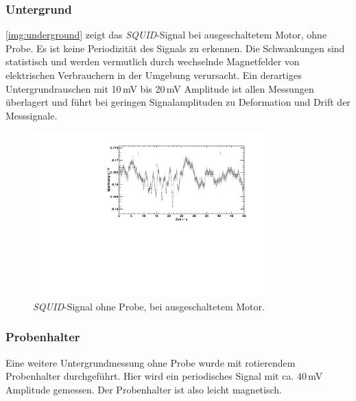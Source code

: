 \subsubsection{Untergrund}
\autoref{img:underground} zeigt das \emph{SQUID}-Signal bei ausgeschaltetem Motor, ohne Probe.
Es ist keine Periodizität des Signals zu erkennen. Die Schwankungen sind statistisch
und werden vermutlich durch wechselnde Magnetfelder von elektrischen Verbrauchern in der Umgebung verursacht.
Ein derartiges Untergrundrauschen mit 10\,mV bis 20\,mV Amplitude
ist allen Messungen überlagert und führt bei geringen Signalamplituden zu
Deformation und Drift der Messsignale.

\begin{figure}[H]
\begin{center}
  \includegraphics[width=0.8\textwidth]{../img/Untergrund.pdf}
  \caption{\emph{SQUID}-Signal ohne Probe, bei ausgeschaltetem Motor.}
  \label{img:underground}
\end{center}
\end{figure}

\subsubsection{Probenhalter}
Eine weitere Untergrundmessung ohne Probe wurde mit rotierendem Proben\-hal\-ter durch\-ge\-führt.
Hier wird ein periodisches Signal mit ca. 40\,mV Amplitude gemessen.
Der Probenhalter ist also leicht magnetisch.\\

